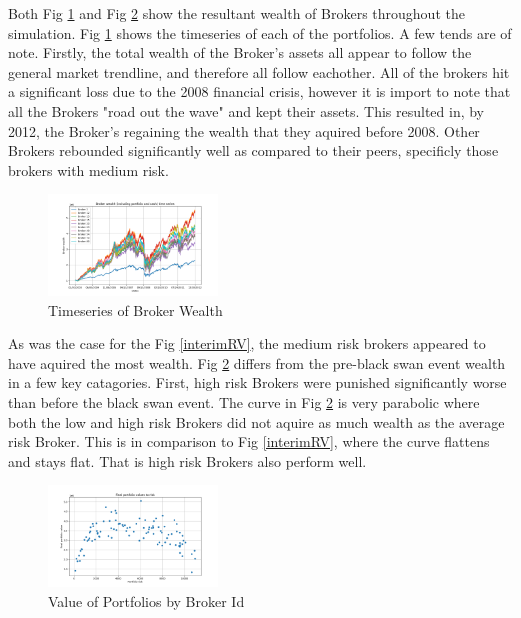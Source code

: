 \documentclass[letterpaper, 10 pt, proceedings]{ieeetran}
\begin{document}
	Both Fig \ref{ts_03-12} and Fig \ref{RV} show the resultant wealth of Brokers throughout the simulation. Fig \ref{ts_03-12} shows the timeseries of each of the portfolios. A few tends are of note. Firstly, the total wealth of the Broker's assets all appear to follow the general market trendline, and therefore all follow eachother. All of the brokers hit a significant loss due to the 2008 financial crisis, however it is import to note that all the Brokers "road out the wave" and kept their assets. This resulted in, by 2012, the Broker's regaining the wealth that they aquired before 2008. Other Brokers rebounded significantly well as compared to their peers, specificly those brokers with medium risk.
	\begin{figure}[h]
		\centering
		\includegraphics[width=0.4\textwidth]{timeSeriesJoint.png}
		\caption{Timeseries of Broker Wealth}
		\label{ts_03-12}
	\end{figure}
	\FloatBarrier

	As was the case for the Fig \ref{interimRV}, the medium risk brokers appeared to have aquired the most wealth. Fig \ref{RV} differs from the pre-black swan event wealth in a few key catagories. First, high risk Brokers were punished significantly worse than before the black swan event. The curve in Fig \ref{RV} is very parabolic where both the low and high risk Brokers did not aquire as much wealth as the average risk Broker. This is in comparison to Fig \ref{interimRV}, where the curve flattens and stays flat. That is high risk Brokers also perform well.

	\begin{figure}[h]
		\centering
		\includegraphics[width=0.4\textwidth]{valueToRisk.png}
		\caption{Value of Portfolios by Broker Id}
		\label{RV}
	\end{figure}
	\FloatBarrier
\end{document}
